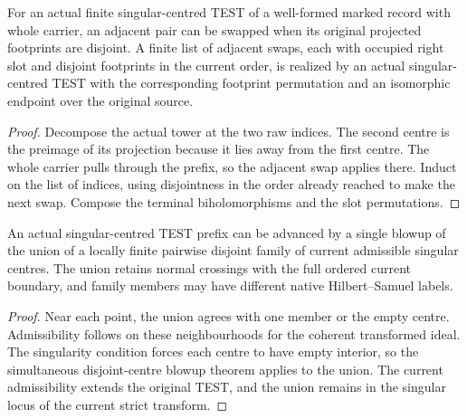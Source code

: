 \begin{theorem}
\label{hir:g8-indexed-disjoint-swaps}
\leanok
For an actual finite singular-centred TEST of a well-formed marked
record with whole carrier, an adjacent pair can be swapped when its
original projected footprints are disjoint. A finite list of adjacent
swaps, each with occupied right slot and disjoint footprints in the
current order, is realized by an actual singular-centred TEST with
the corresponding footprint permutation and an isomorphic endpoint
over the original source.
\end{theorem}
\begin{proof}
Decompose the actual tower at the two raw indices. The second centre
is the preimage of its projection because it lies away from the
first centre. The whole carrier pulls through the prefix, so the
adjacent swap applies there. Induct on the list of indices, using
disjointness in the order already reached to make the next swap.
Compose the terminal biholomorphisms and the slot permutations.
\end{proof}

\begin{theorem}
\label{hir:g8-parallel-admissible-centres}
\leanok
An actual singular-centred TEST prefix can be advanced by a single
blowup of the union of a locally finite pairwise disjoint family of
current admissible singular centres. The union retains normal
crossings with the full ordered current boundary, and family members
may have different native Hilbert--Samuel labels.
\end{theorem}
\begin{proof}
Near each point, the union agrees with one member or the empty
centre. Admissibility follows on these neighbourhoods for the
coherent transformed ideal. The singularity condition forces each
centre to have empty interior, so the simultaneous disjoint-centre
blowup theorem applies to the union. The current admissibility
extends the original TEST, and the union remains in the singular
locus of the current strict transform.
\end{proof}

